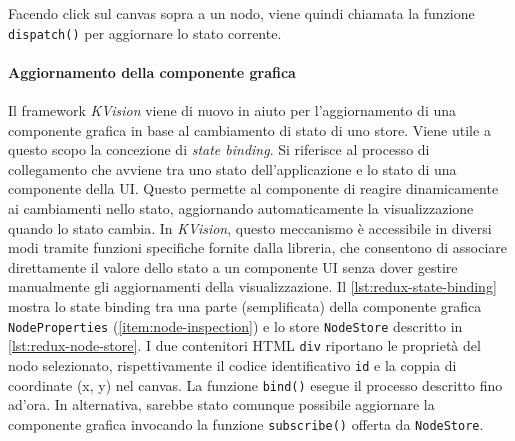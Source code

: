 
Facendo click sul canvas sopra a un nodo, viene quindi chiamata la funzione \texttt{dispatch()} per aggiornare lo stato corrente.




\paragraph{Aggiornamento della componente grafica}
Il framework \textit{KVision} viene di nuovo in aiuto per l'aggiornamento di una componente grafica in base al cambiamento di stato di uno store. Viene utile a questo scopo la concezione di \textit{state binding}. Si riferisce al processo di collegamento che avviene tra uno stato dell'applicazione e lo stato di una componente della \ac{UI}.  Questo permette al componente di reagire dinamicamente ai cambiamenti nello stato, aggiornando automaticamente la visualizzazione quando lo stato cambia. In \textit{KVision}, questo meccanismo è accessibile in diversi modi tramite funzioni specifiche fornite dalla libreria, che consentono di associare direttamente il valore dello stato a un componente \ac{UI} senza dover gestire manualmente gli aggiornamenti della visualizzazione. Il \cref{lst:redux-state-binding} mostra lo state binding tra una parte (semplificata) della componente grafica \texttt{NodeProperties} (\cref{item:node-inspection}) e lo store \texttt{NodeStore} descritto in \cref{lst:redux-node-store}. I due contenitori HTML \texttt{div} riportano le proprietà del nodo selezionato, rispettivamente il codice identificativo \texttt{id} e la coppia di coordinate (x, y) nel canvas.
La funzione \texttt{bind()} esegue il processo descritto fino ad'ora. In alternativa, sarebbe stato comunque possibile aggiornare la componente grafica invocando la funzione \texttt{subscribe()} offerta da \texttt{NodeStore}. 


